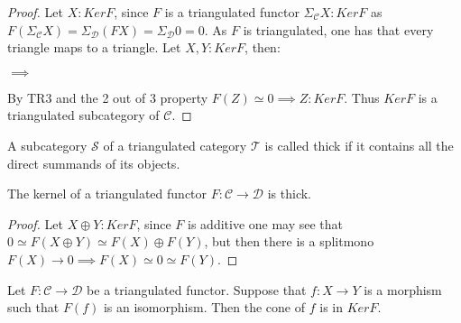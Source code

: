     \begin{proof}
        Let $X:KerF$, since $F$ is a triangulated functor $\Sigma_{\mathcal{C}}X:KerF$ as $F(\Sigma_{\mathcal{C}}X)=\Sigma_{\mathcal{D}}(FX)=\Sigma_{\mathcal{D}}0=0$. As $F$ is triangulated, one has that every triangle maps to a triangle. Let $X,Y:KerF$, then:
        \begin{center}
            $\implies$
        \end{center}
        By TR3 and the 2 out of 3 property $F(Z)\simeq 0 \implies Z:KerF$. Thus $KerF$ is a triangulated subcategory of $\mathcal{C}$.
    \end{proof}

    \begin{definition}
        A subcategory $\mathcal{S}$ of a triangulated category $\mathcal{T}$ is called thick if it contains all the direct summands of its objects.
    \end{definition}

    \begin{lemma}
        The kernel of a triangulated functor $F:\mathcal{C}\rightarrow\mathcal{D}$ is thick.
    \end{lemma}

    \begin{proof}
        Let $X\oplus Y:KerF$, since $F$ is additive one may see that $0\simeq F(X\oplus Y)\simeq F(X)\oplus F(Y)$, but then there is a splitmono $F(X)\rightarrow 0 \implies F(X)\simeq 0 \simeq F(Y)$.
    \end{proof}

    \begin{lemma}
        Let $F:\mathcal{C}\rightarrow\mathcal{D}$ be a triangulated functor. Suppose that $f:X\rightarrow Y$ is a morphism such that $F(f)$ is an isomorphism. Then the cone of $f$ is in $KerF$.
    \end{lemma}

